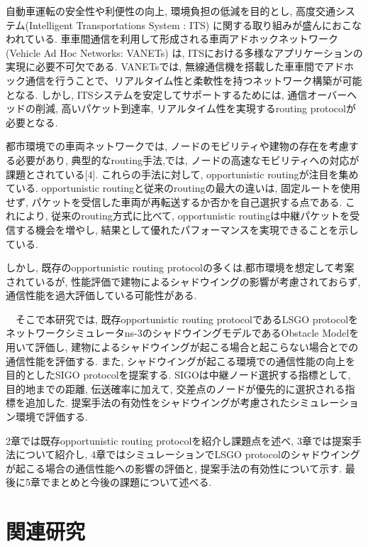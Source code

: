 \documentclass[technicalreport]{ieicej}
\begin{document}
自動車運転の安全性や利便性の向上, 環境負担の低減を目的とし, 高度交通システム(Intelligent Transportations System : ITS) \cite{ITS} に関する取り組みが盛んにおこなわれている. 車車間通信を利用して形成される車両アドホックネットワーク(Vehicle Ad Hoc Networks: VANETs) は, ITSにおける多様なアプリケーションの実現に必要不可欠である. VANETsでは, 無線通信機を搭載した車車間でアドホック通信を行うことで、リアルタイム性と柔軟性を持つネットワーク構築が可能となる. しかし,  ITSシステムを安定してサポートするためには, 通信オーバーヘッドの削減, 高いパケット到達率, リアルタイム性を実現するrouting protocolが必要となる. \par
 都市環境での車両ネットワークでは, ノードのモビリティや建物の存在を考慮する必要があり, 典型的なrouting手法\cite{Old1},\cite{Old2}では, ノードの高速なモビリティへの対応が課題とされている[4]. これらの手法に対して, opportunistic routingが注目を集めている\cite{EXOR}. opportunistic routingと従来のroutingの最大の違いは, 固定ルートを使用せず, パケットを受信した車両が再転送するか否かを自己選択する点である. これにより, 従来のrouting方式に比べて, opportunistic routingは中継パケットを受信する機会を増やし, 結果として優れたパフォーマンスを実現できることを示している.\par
 しかし, 既存のopportunistic routing protocolの多くは,都市環境を想定して考案されているが, 性能評価で建物によるシャドウイングの影響が考慮されておらず,通信性能を過大評価している可能性がある.
 
　そこで本研究では, 既存opportunistic routing protocolであるLSGO protocol\cite{LSGO}をネットワークシミュレータns-3のシャドウイングモデルであるObstacle Model\cite{Obstacle}を用いて評価し, 建物によるシャドウイングが起こる場合と起こらない場合とでの通信性能を評価する. また, シャドウイングが起こる環境での通信性能の向上を目的としたSIGO protocolを提案する. SIGOは中継ノード選択する指標として, 目的地までの距離, 伝送確率に加えて, 交差点のノードが優先的に選択される指標を追加した. 提案手法の有効性をシャドウイングが考慮されたシミュレーション環境で評価する.\par
 2章では既存opportunistic routing protocolを紹介し課題点を述べ, 3章では提案手法について紹介し, 4章ではシミュレーションでLSGO protocolのシャドウイングが起こる場合の通信性能への影響の評価と, 提案手法の有効性について示す. 最後に5章でまとめと今後の課題について述べる.


\section{関連研究}
\end{document}
